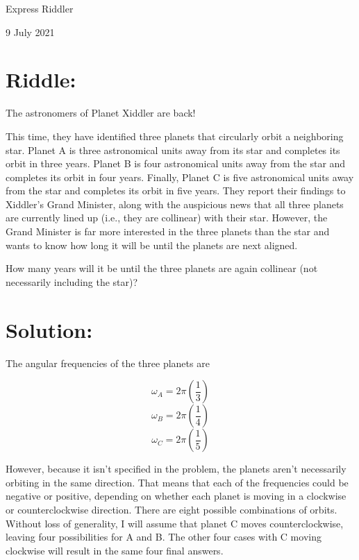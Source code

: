 \documentclass{article}
\begin{document}
\pagestyle{empty} %

\begin{center}
{\LARGE Express Riddler}

\vspace{0.15in}

{\Large 9 July 2021}
\end{center}


\section*{Riddle:}

The astronomers of Planet Xiddler are back!

This time, they have identified three planets that circularly orbit a neighboring star.
Planet A is three astronomical units away from its star and completes its orbit in three years.
Planet B is four astronomical units away from the star and completes its orbit in four years.
Finally, Planet C is five astronomical units away from the star and completes its orbit in five years.
They report their findings to Xiddler's Grand Minister, along with the auspicious news that all three planets are currently lined up (i.e., they are collinear) with their star.
However, the Grand Minister is far more interested in the three planets than the star and wants to know how long it will be until the planets are next aligned.

How many years will it be until the three planets are again collinear (not necessarily including the star)?


\section*{Solution:}

The angular frequencies of the three planets are

\[
\omega_{A}=2\pi\left(\frac{1}{3}\right)
\]
\[
\omega_{B}=2\pi\left(\frac{1}{4}\right)
\]
\[
\omega_{C}=2\pi\left(\frac{1}{5}\right)
\]

However, because it isn't specified in the problem, the planets aren't necessarily orbiting in the same direction.
That means that each of the frequencies could be negative or positive, depending on whether each planet is moving in a clockwise or counterclockwise direction.
There are eight possible combinations of orbits.
Without loss of generality, I will assume that planet C moves counterclockwise, leaving four possibilities for A and B.
The other four cases with C moving clockwise will result in the same four final answers.
\end{document}
